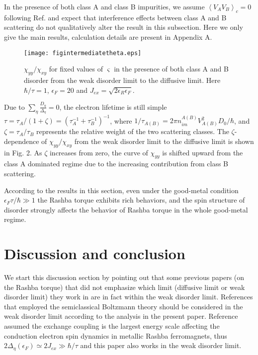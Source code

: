 \documentclass
[aps,pra,amsfonts,amssymb,twocolumn,amsmath,preprintnumbers,nofootinbib,floatfix,
showpacs,superscriptaddress]{revtex4-1}%
\begin{document}
In the presence of both class A and class B impurities, we assume
$\left\langle V_{A}V_{B}\right\rangle _{c}=0$ following Ref.
 and expect that interference effects between class A and
B scattering do not qualitatively alter the result in this subsection. Here we
only give the main results, calculation details are present in Appendix
A.\begin{figure}[ptbh]
\texttt{[image: figintermediatetheta.eps]} \caption{
$\chi_{yy}/\chi_{xy}$ for fixed values of $\varsigma$ in the presence of both
class A and B disorder from the weak disorder limit to the diffusive limit.
Here $\hbar/\tau=1$, $\epsilon_{F}=20$ and $J_{ex}=\sqrt{2\epsilon_{R}%
\epsilon_{F}}$.}%
\label{fig4}%
\end{figure}

Due to $\sum_{\eta}\frac{D_{\eta}}{\Delta_{\eta}}=0$, the electron lifetime is
still simple $\tau=\tau_{A}/\left(  1+\zeta\right)  =\left(  \tau_{A}%
^{-1}+\tau_{B}^{-1}\right)  ^{-1}$, where $1/\tau_{A\left(  B\right)  }=2\pi
n_{im}^{A\left(  B\right)  }V_{A\left(  B\right)  }^{2}D_{0}/\hbar$, and
$\zeta=\tau_{A}/\tau_{B}$ represents the relative weight of the two scattering
classes. The $\zeta$-dependence of $\chi_{yy}/\chi_{xy}$ from the weak
disorder limit to the diffusive limit is shown in Fig. 2. As $\zeta$ increases
from zero, the curve of $\chi_{yy}$ is shifted upward from the class A
dominated regime due to the increasing contribution from class B scattering.

According to the results in this section, even under the good-metal condition
$\epsilon_{F}\tau/\hbar\gg1$ the Rashba torque exhibits rich behaviors, and
the spin structure of disorder strongly affects the behavior of Rashba torque
in the whole good-metal regime.

\section{Discussion and conclusion}

We start this discussion section by pointing out that some previous papers
(on the Rashba torque) that did not emphasize which limit (diffusive limit or weak disorder limit)
they work in are in fact within the weak disorder limit. References
 that employed the semiclassical
Boltzmann theory should be considered in the weak disorder limit according to
the analysis in the present paper. Reference  assumed the
exchange coupling is the largest energy scale affecting the conduction
electron spin dynamics in metallic Rashba ferromagnets, thus $2\Delta_{\eta
}\left(  \epsilon_{F}\right)  \simeq2J_{ex}\gg\hbar/\tau$ and this paper also
works in the weak disorder limit.
\end{document}
